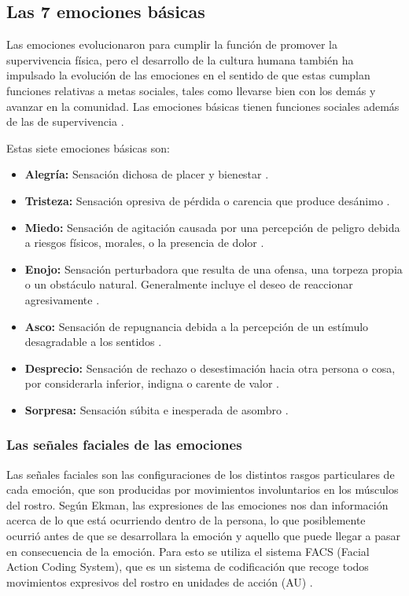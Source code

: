 \subsection*{Las 7 emociones básicas}
Las emociones evolucionaron para cumplir la función de promover la supervivencia física, pero el desarrollo de la cultura humana también ha impulsado la evolución de las emociones en el sentido de que estas cumplan funciones relativas a metas sociales, tales como llevarse bien con los demás y avanzar en la comunidad. Las emociones básicas tienen funciones sociales además de las de supervivencia \cite{rulicki2012cnv}.

Estas siete emociones básicas son:
\begin{itemize}
\item \textbf{Alegría:} Sensación dichosa de placer y bienestar \cite{rulicki2012cnv}.
\item \textbf{Tristeza:} Sensación opresiva de pérdida o carencia que produce desánimo \cite{rulicki2012cnv}.
\item \textbf{Miedo:} Sensación de agitación causada por una percepción de peligro debida a riesgos físicos, morales, o la presencia de dolor \cite{rulicki2012cnv}.
\item \textbf{Enojo:} Sensación perturbadora que resulta de una ofensa, una torpeza propia o un obstáculo natural. Generalmente incluye el deseo de reaccionar agresivamente \cite{rulicki2012cnv}.
\item \textbf{Asco:} Sensación de repugnancia debida a la percepción de un estímulo desagradable a los sentidos \cite{rulicki2012cnv}.
\item \textbf{Desprecio:} Sensación de rechazo o desestimación hacia otra persona o cosa, por considerarla inferior, indigna o carente de valor \cite{rulicki2012cnv}.
\item \textbf{Sorpresa:} Sensación súbita e inesperada de asombro \cite{rulicki2012cnv}.
\end{itemize}

\subsubsection*{Las señales faciales de las emociones}
Las señales faciales son las configuraciones de los distintos rasgos particulares de cada emoción, que son producidas por movimientos involuntarios en los músculos del rostro. Según Ekman, las expresiones de las emociones nos dan información acerca de lo que está ocurriendo dentro de la persona, lo que posiblemente ocurrió antes de que se desarrollara la emoción y aquello que puede llegar a pasar en consecuencia de la emoción. Para esto se utiliza el sistema FACS (Facial Action Coding System), que es un sistema de codificación que recoge todos movimientos expresivos del rostro en unidades de acción (AU) \cite{ekman2017rostro}.

